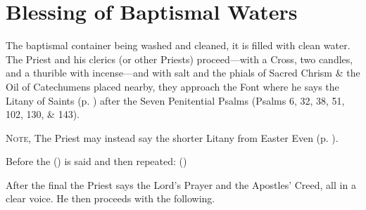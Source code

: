 \section{Blessing of Baptismal Waters}\label{BaptismalBlessing}
\fancyhead[RE,LO]{}
\begin{secrubric}
    The baptismal container being washed and cleaned, it is filled with clean water. The Priest and his clerics (or other Priests) proceed---with a Cross, two candles, and a thurible with incense---and with salt and the phials of Sacred Chrism \& the Oil of Catechumens placed nearby, they approach the Font where he says the Litany of Saints (p. \pageref{LitanySaints}) after the Seven Penitential Psalms (Psalms 6, 32, 38, 51, 102, 130, \& 143).
\end{secrubric}
\begin{rubric}
	\textsc{Note,} The Priest may instead say the shorter Litany from Easter Even (p. \pageref{PaschalLitany}).
\end{rubric}
\begin{rubric}
    Before the  () is said and then repeated:  ()
\end{rubric}
\begin{rubric}
    After the final  the Priest says the Lord's Prayer and the Apostles' Creed, all in a clear voice. He then proceeds with the following.
\end{rubric}






